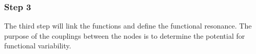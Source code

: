 \subsubsection*{Step 3}
The third step will link the functions and define the functional resonance. The purpose of the couplings between the nodes is to determine the potential for functional variability.


